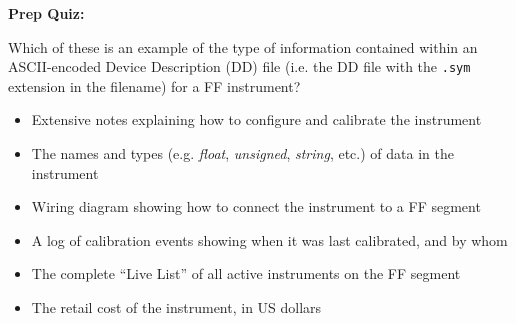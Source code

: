 \vfil \eject

\noindent
{\bf Prep Quiz:}

Which of these is an example of the type of information contained within an ASCII-encoded Device Description (DD) file (i.e. the DD file with the {\tt .sym} extension in the filename) for a FF instrument?

\begin{itemize}
\item{} Extensive notes explaining how to configure and calibrate the instrument
\vskip 5pt 
\item{} The names and types (e.g. {\it float}, {\it unsigned}, {\it string}, etc.) of data in the instrument
\vskip 5pt 
\item{} Wiring diagram showing how to connect the instrument to a FF segment
\vskip 5pt 
\item{} A log of calibration events showing when it was last calibrated, and by whom
\vskip 5pt 
\item{} The complete ``Live List'' of all active instruments on the FF segment
\vskip 5pt 
\item{} The retail cost of the instrument, in US dollars
\end{itemize}





